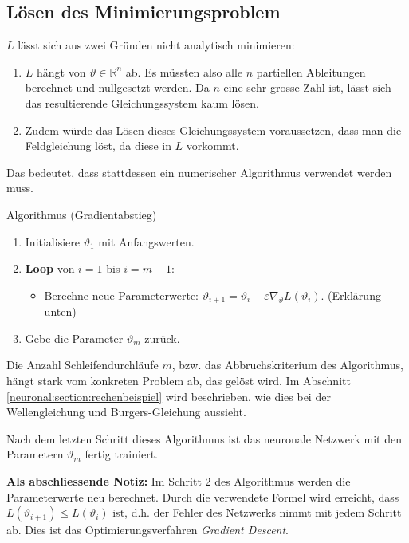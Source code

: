 \subsection{Lösen des Minimierungsproblem}\label{neuronal:subsection:lösen_optimierungsproblem}
\( L \) lässt sich aus zwei Gründen nicht analytisch minimieren:
\begin{enumerate}
    \item \( L \) hängt von \( \vartheta \in \mathbb{R}^n \) ab. 
    Es müssten also alle \( n \) partiellen Ableitungen berechnet und nullgesetzt werden. 
    Da \( n \) eine sehr grosse Zahl ist, lässt sich das resultierende Gleichungssystem kaum lösen.
    \item Zudem würde das Lösen dieses Gleichungssystem voraussetzen, dass man die Feldgleichung löst, da diese in $L$ vorkommt.
\end{enumerate}
Das bedeutet, dass stattdessen ein numerischer Algorithmus verwendet werden muss.

\begin{aufgabe}
    Algorithmus (Gradientabstieg)
    \begin{enumerate}
        \item Initialisiere \( \vartheta_1 \) mit Anfangswerten.
        \item \textbf{Loop} von \( i = 1 \) bis \( i = m - 1 \):
        \begin{itemize}
            \item Berechne neue Parameterwerte: \( \vartheta_{i+1} = \vartheta_i - \varepsilon \nabla_\vartheta L\left(\vartheta_i\right) \). (Erklärung unten)
        \end{itemize}
        \item Gebe die Parameter \( \vartheta_m \) zurück.
    \end{enumerate}
\end{aufgabe}

Die Anzahl Schleifendurchläufe \( m \), bzw. das Abbruchskriterium des Algorithmus, hängt stark vom konkreten Problem ab, das gelöst wird.
Im Abschnitt \ref{neuronal:section:rechenbeispiel} wird beschrieben, wie dies bei der Wellengleichung und Burgers-Gleichung aussieht.

Nach dem letzten Schritt dieses Algorithmus ist das neuronale Netzwerk mit den Parametern \( \vartheta_m \) fertig trainiert.

\textbf{Als abschliessende Notiz:} Im Schritt 2 des Algorithmus werden die Parameterwerte neu berechnet.
Durch die verwendete Formel wird erreicht, dass \( L(\vartheta_{i+1}) \leq L(\vartheta_i) \) ist, d.h. der Fehler des Netzwerks nimmt mit jedem Schritt ab.
Dies ist das Optimierungsverfahren \emph{Gradient Descent}.

